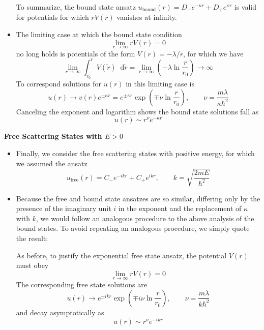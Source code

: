 \documentclass[11pt, a4paper]{article}
\newcommand{\diff}{\mathop{}\!\mathrm{d}} %
\renewcommand{\t}[1]{\tilde{#1}}
\begin{document}
\begin{itemize}
	
	To summarize, the bound state ansatz $ u_{\text{bound}}(r) = D_{-}e^{-\kappa r} + D_{+}e^{\kappa r} $ is valid for potentials for which $ r V(r) $ vanishes at infinity.
	
	\item The limiting case at which the bound state condition 
	\begin{equation*}
		\lim_{r \to \infty}rV(r) = 0
	\end{equation*}
	no long holds is potentials of the form $ V(r) = - \lambda/r $, for which we have
	\begin{equation*}
		\lim_{r \to \infty} \int_{r_{0}}^{r}V(\t{r})\diff \t{r} = \lim_{r \to \infty} \left(- \lambda \ln \frac{r}{r_{0}}\right) \to \infty
	\end{equation*}
	To correspond solutions for $ u(r) $ in this limiting case is
	\begin{equation*}
		u(r) \to v(r)e^{\pm \kappa r} = e^{\pm \kappa r} \exp(\mp \nu \ln  \frac{r}{r_{0}}), \qquad \nu = \frac{m \lambda}{\kappa \hbar^{2}}
	\end{equation*}
	Canceling the exponent and logarithm shows the bound state solutions fall as
	\begin{equation*}
		u(r) \sim r^{\nu} e^{- \kappa r}
	\end{equation*}
	
\end{itemize}

\textbf{Free Scattering States with $ E > 0 $}
\begin{itemize}
	\item Finally, we consider the free scattering states with positive energy, for which we assumed the ansatz
	\begin{equation*}
		u_{\text{free}}(r) = C_{-}e^{-i k r} + C_{+}e^{i k r}, \qquad k = \sqrt{\frac{2mE}{\hbar^{2}}}
	\end{equation*}
	
	\item Because the free and bound state ansatzes are so similar, differing only by the presence of the imaginary unit $ i $ in the exponent and the replacement of $ \kappa $ with $ k $, we would follow an analogous procedure to the above analysis of the bound states. To avoid repeating an analogous procedure, we simply quote the result: 
	
	As before, to justify the exponential free state ansatz, the potential $ V(r) $ must obey
	\begin{equation*}
		\lim_{r \to \infty} r V(r) = 0
	\end{equation*}
	The corresponding free state solutions are
	\begin{equation*}
		u(r) \to e^{\pm i k r} \exp(\mp i \nu \ln  \frac{r}{r_{0}}), \qquad \nu = \frac{m \lambda}{k \hbar^{2}}
	\end{equation*}
	and decay asymptotically as
	\begin{equation*}
		u(r) \sim r^{\nu} e^{- ik r}
	\end{equation*}
\end{itemize}
\end{document}
